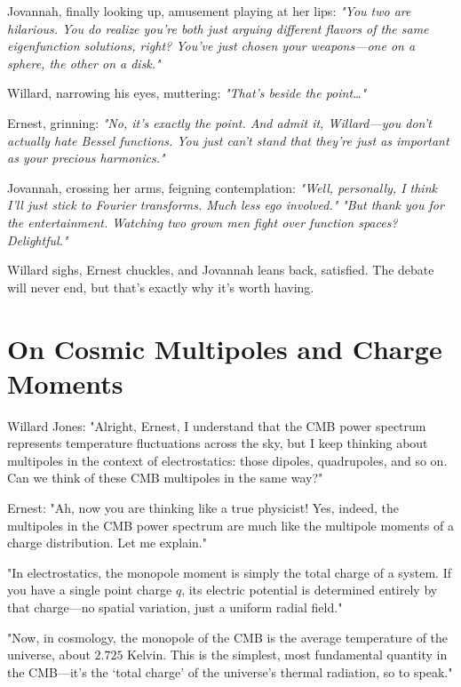 \bigskip

Jovannah, finally looking up, amusement playing at her lips: \textit{"You two are hilarious. You do realize you’re both just arguing different flavors of the same eigenfunction solutions, right? You’ve just chosen your weapons—one on a sphere, the other on a disk."}

\bigskip

Willard, narrowing his eyes, muttering: \textit{"That’s beside the point…"}

\bigskip

Ernest, grinning: \textit{"No, it’s exactly the point. And admit it, Willard—you don’t actually hate Bessel functions. You just can’t stand that they’re just as important as your precious harmonics."}

\bigskip

Jovannah, crossing her arms, feigning contemplation: \textit{"Well, personally, I think I’ll just stick to Fourier transforms. Much less ego involved."} \newline
\textit{"But thank you for the entertainment. Watching two grown men fight over function spaces? Delightful."}

\bigskip

Willard sighs, Ernest chuckles, and Jovannah leans back, satisfied. The debate will never end, but that’s exactly why it’s worth having.

\section*{On Cosmic Multipoles and Charge Moments}

Willard Jones: 
"Alright, Ernest, I understand that the CMB power spectrum represents temperature fluctuations across the sky, but I keep thinking about multipoles in the context of electrostatics: those dipoles, quadrupoles, and so on. Can we think of these CMB multipoles in the same way?"

Ernest:
"Ah, now you are thinking like a true physicist! Yes, indeed, the multipoles in the CMB power spectrum are much like the multipole moments of a charge distribution. Let me explain."

"In electrostatics, the monopole moment is simply the total charge of a system. If you have a single point charge \( q \), its electric potential is determined entirely by that charge—no spatial variation, just a uniform radial field."

"Now, in cosmology, the monopole of the CMB is the average temperature of the universe, about \( 2.725 \) Kelvin. This is the simplest, most fundamental quantity in the CMB—it’s the ‘total charge’ of the universe’s thermal radiation, so to speak."

